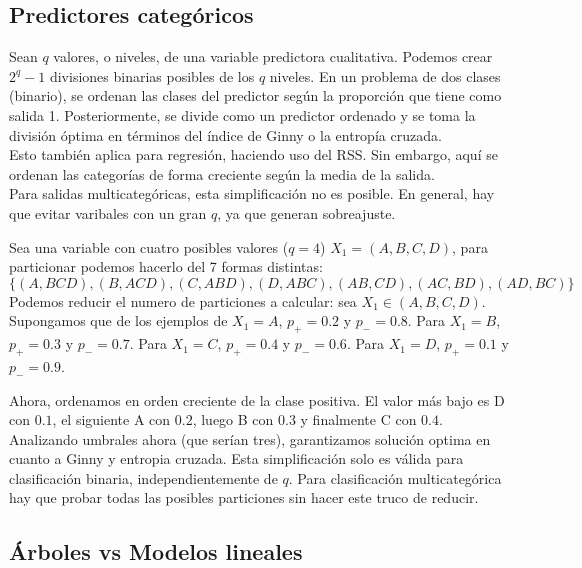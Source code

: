 \subsection{Predictores categóricos}

Sean $q$ valores, o niveles, de una variable predictora cualitativa. Podemos crear $2^q - 1$ divisiones binarias posibles de los $q$ niveles. En un problema de dos clases (binario), se ordenan las clases del predictor según la proporción que tiene como salida 1. Posteriormente, se divide como un predictor ordenado y se toma la división óptima en términos del índice de Ginny o la entropía cruzada. \\

Esto también aplica para regresión, haciendo uso del RSS. Sin embargo, aquí se ordenan las categorías de forma creciente según la media de la salida. \\

Para salidas multicategóricas, esta simplificación no es posible. En general, hay que evitar varibales con un gran $q$, ya que generan sobreajuste.

\begin{example}
Sea una variable con cuatro posibles valores ($q = 4$) $X_1 = (A, B, C, D)$, para particionar podemos hacerlo del 7 formas distintas: 
\begin{equation}
\{(A, BCD), (B, ACD), (C, ABD), (D, ABC), (AB, CD), (AC, BD), (AD, BC)\}
\end{equation}
Podemos reducir el numero de particiones a calcular: sea $X_1 \in (A, B, C, D)$. Supongamos que de los ejemplos de $X_1 = A$, $p_+ = 0.2$ y $p_- = 0.8$. Para $X_1 = B$, $p_+ = 0.3$ y $p_- = 0.7$. Para $X_1 = C$, $p_+ = 0.4$ y $p_- = 0.6$. Para $X_1 = D$, $p_+ = 0.1$ y $p_- = 0.9$. 

Ahora, ordenamos en orden creciente de la clase positiva. El valor más bajo es D con $0.1$, el siguiente A con $0.2$, luego B con $0.3$ y finalmente C con $0.4$. Analizando umbrales ahora (que serían tres), garantizamos solución optima en cuanto a Ginny y entropia cruzada. Esta simplificación solo es válida para clasificación binaria, independientemente de $q$. Para clasificación multicategórica hay que probar todas las posibles particiones sin hacer este truco de reducir.
\end{example}

\subsection{Árboles vs Modelos lineales}

